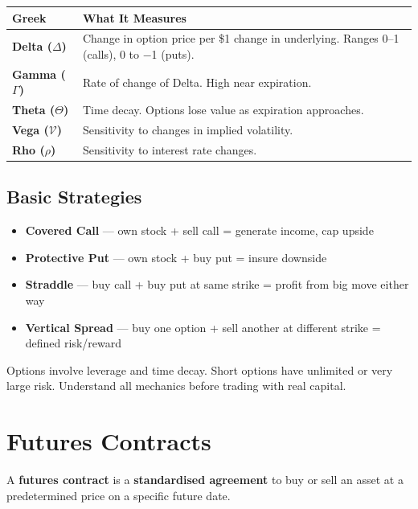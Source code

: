 \begin{center}
\begin{tabular}{>{\bfseries}p{2cm} p{10.5cm}}
\toprule
Greek & What It Measures \\
\midrule
Delta ($\Delta$) & Change in option price per \$1 change in underlying. Ranges 0--1 (calls), 0 to $-$1 (puts). \\
Gamma ($\Gamma$) & Rate of change of Delta. High near expiration. \\
Theta ($\Theta$) & Time decay. Options lose value as expiration approaches. \\
Vega ($\mathcal{V}$) & Sensitivity to changes in implied volatility. \\
Rho ($\rho$) & Sensitivity to interest rate changes. \\
\bottomrule
\end{tabular}
\end{center}

\subsection{Basic Strategies}
\begin{itemize}
  \item \textbf{Covered Call} — own stock + sell call = generate income, cap upside
  \item \textbf{Protective Put} — own stock + buy put = insure downside
  \item \textbf{Straddle} — buy call + buy put at same strike = profit from big move either way
  \item \textbf{Vertical Spread} — buy one option + sell another at different strike = defined risk/reward
\end{itemize}

\begin{warningbox}
Options involve leverage and time decay. Short options have unlimited or very large risk.
Understand all mechanics before trading with real capital.
\end{warningbox}

\section{Futures Contracts}

A \textbf{futures contract} is a \textbf{standardised agreement} to buy or sell an asset
at a predetermined price on a specific future date.

